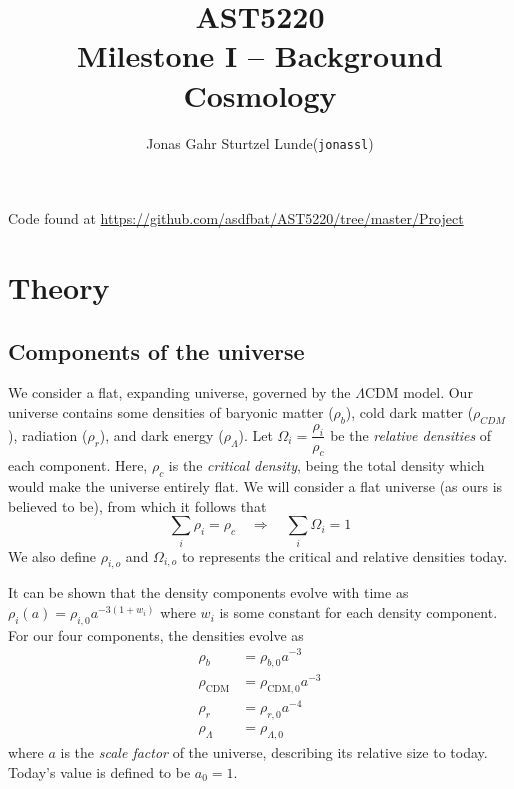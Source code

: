 \documentclass[10pt, a4paper]{article}
\begin{document}
\title{AST5220\\ Milestone I -- Background Cosmology}
\author{
    \begin{tabular}{r l}
        Jonas Gahr Sturtzel Lunde & (\texttt{jonassl})
    \end{tabular}}

\maketitle
Code found at \url{https://github.com/asdfbat/AST5220/tree/master/Project}
\vspace{0.7cm}

\section{Theory}
\subsection{Components of the universe}
We consider a flat, expanding universe, governed by the $\Lambda \text{CDM}$ model. Our universe contains some densities of baryonic matter ($\rho_b$), cold dark matter ($\rho_{CDM}$), radiation ($\rho_r$), and dark energy ($\rho_\Lambda$). Let $\Omega_i = \dfrac{\rho_i}{\rho_c}$ be the \textit{relative densities} of each component. Here, $\rho_c$ is the \textit{critical density}, being the total density which would make the universe entirely flat. We will consider a flat universe (as ours is believed to be), from which it follows that
\begin{equation}\label{eqn:sum1}
    \sum_i \rho_i = \rho_c \quad \Rightarrow \quad \sum_i \Omega_i = 1
\end{equation}
We also define $\rho_{i,o}$ and $\Omega_{i,o}$ to represents the critical and relative densities today.

It can be shown \cite{ModernCosmology2003} that the density components evolve with time as $\rho_i(a) = \rho_{i,0}a^{-3(1+w_i)}$ where $w_i$ is some constant for each density component. For our four components, the densities evolve as
\begin{align*}
    \rho_b &= \rho_{b,0} a^{-3} \\
    \rho_\text{CDM} &= \rho_{\text{CDM},0} a^{-3} \\
    \rho_r &= \rho_{r,0} a^{-4} \\
    \rho_\Lambda &= \rho_{\Lambda,0}
\end{align*}
where $a$ is the \textit{scale factor} of the universe, describing its relative size to today. Today's value is defined to be $a_0 = 1$.
\end{document}
